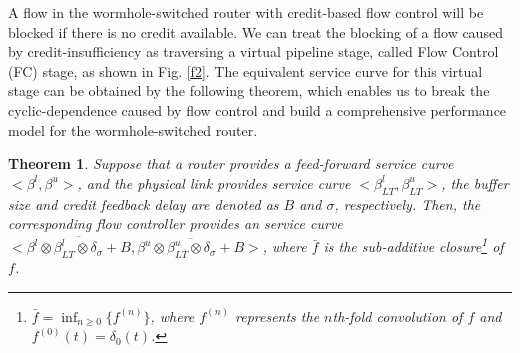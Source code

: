 \documentclass[preprint]{elsarticle}
\newtheorem{thm}{Theorem}
\begin{document}
A flow in the wormhole-switched router with credit-based flow control will be blocked if there is no credit available. We can treat the blocking of a flow caused by credit-insufficiency as traversing a virtual pipeline stage, called Flow Control (FC) stage, as shown in Fig. \ref{f2}. The equivalent service curve for this virtual stage can be obtained by the following theorem, which enables us to break the cyclic-dependence caused by flow control and build a comprehensive performance model for the wormhole-switched router.
\begin{thm}\label{credit}
Suppose that a router provides a feed-forward service curve $<\beta^l,\beta^u>$, and the physical link provides service curve $<\beta_{LT}^l,\beta_{LT}^u>$, the buffer size and credit feedback delay are denoted as $B$ and $\sigma$, respectively. Then, the corresponding flow controller provides an service curve $<\overline{\beta^l\otimes\beta_{LT}^l\otimes\delta_{\sigma}+B},\overline{\beta^u\otimes\beta_{LT}^u\otimes\delta_{\sigma}+B}>$, where $\bar{f}$ is the sub-additive closure\footnote{$\bar{f}=\inf_{n\geq 0}\{f^{(n)}\}$, where $f^{(n)}$ represents the $n$th-fold convolution of $f$ and $f^{(0)}(t)=\delta_0(t)$.} of $f$.
\end{thm}
\end{document}
